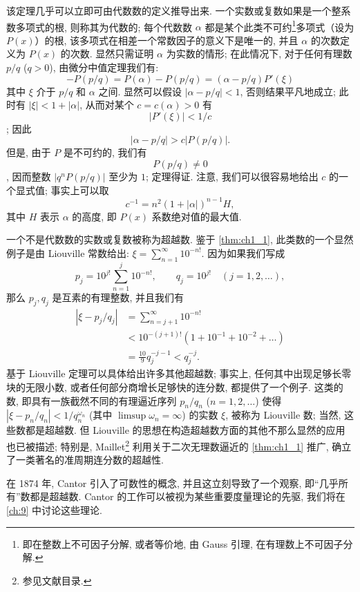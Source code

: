 该定理几乎可以立即可由代数数的定义推导出来. 一个实数或复数如果是一个整系数多项式的根, 则称其为代数的; 每个代数数 $\alpha$ 都是某个此类不可约\footnote{即在整数上不可因子分解, 或者等价地, 由 Gauss 引理, 在有理数上不可因子分解.}多项式（设为 $P(x)$）的根, 该多项式在相差一个常数因子的意义下是唯一的, 并且 $\alpha$ 的次数定义为 $P(x)$ 的次数. 显然只需证明 $\alpha$ 为实数的情形; 在此情况下, 对于任何有理数 $p/q$ ($q > 0$), 由微分中值定理我们有:
\[
-P(p/q) = P(\alpha) - P(p/q) = (\alpha - p/q) P'(\xi)
\]
其中 $\xi$ 介于 $p/q$ 和 $\alpha$ 之间. 显然可以假设 $|\alpha - p/q| < 1$, 否则结果平凡地成立; 此时有 $|\xi| < 1 + |\alpha|$, 从而对某个 $c = c(\alpha) > 0$ 有 \[|P'(\xi)| < 1/c\]; 因此
\[
|\alpha - p/q| > c |P(p/q)|.
\]
但是, 由于 $P$ 是不可约的, 我们有 \[P(p/q) \neq 0\], 因而整数 $|q^n P(p/q)|$ 至少为 $1$; 定理得证. 注意, 我们可以很容易地给出 $c$ 的一个显式值; 事实上可以取
\[
c^{-1} = n^2(1+|\alpha|)^{n-1} H,
\]
其中 $H$ 表示 $\alpha$ 的高度, 即 $P(x)$ 系数绝对值的最大值.

一个不是代数数的实数或复数被称为超越数. 鉴于 \autoref{thm:ch1_1}, 此类数的一个显然例子是由 Liouville 常数给出: $\xi = \sum_{n=1}^{\infty} 10^{-n!}$. 因为如果我们写成
\[
p_j = 10^{j!} \sum_{n=1}^{j} 10^{-n!}, \qquad q_j = 10^{j!} \quad (j = 1, 2, \dots),
\]
那么 $p_j, q_j$ 是互素的有理整数, 并且我们有
\begin{align*}
|\xi - p_j/q_j| &= \sum_{n=j+1}^{\infty} 10^{-n!} \\
&< 10^{-(j+1)!} (1 + 10^{-1} + 10^{-2} + \dots) \\
&= \frac{10}{9} q_j^{-j-1} < q_j^{-j}.
\end{align*}
基于 Liouville 定理可以具体给出许多其他超越数; 事实上, 任何其中出现足够长零块的无限小数, 或者任何部分商增长足够快的连分数, 都提供了一个例子. 这类的数, 即具有一族截然不同的有理逼近序列 $p_n/q_n$ ($n=1,2,\dots$) 使得 $|\xi - p_n/q_n| < 1/q_n^{\omega_n}$ (其中 $\limsup \omega_n = \infty$) 的实数 $\xi$, 被称为 Liouville 数; 当然, 这些数都是超越数. 但 Liouville 的思想在构造超越数方面的其他不那么显然的应用也已被描述; 特别是, Maillet\footnote{参见文献目录.} 利用关于二次无理数逼近的 \autoref{thm:ch1_1} 推广, 确立了一类著名的准周期连分数的超越性.

在 1874 年, Cantor 引入了可数性的概念, 并且这立刻导致了一个观察, 即“几乎所有”数都是超越数. Cantor 的工作可以被视为某些重要度量理论的先驱, 我们将在 \autoref{ch:9} 中讨论这些理论.


